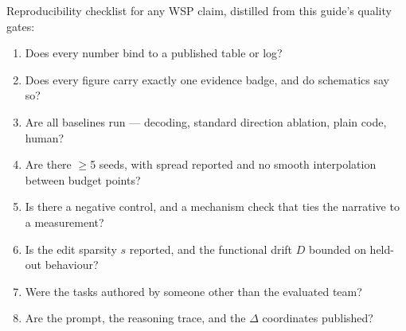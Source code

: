 \documentclass[11pt,a4paper]{article}
\begin{document}
Reproducibility checklist for any WSP claim, distilled from this guide's quality gates: \begin{enumerate}[leftmargin=1.6em, itemsep=1pt]
\item Does every number bind to a published table or log?
\item Does every figure carry exactly one evidence badge, and do schematics say so?
\item Are all baselines run --- decoding, standard direction ablation, plain code, human?
\item Are there $\geq$5 seeds, with spread reported and no smooth interpolation between budget points?
\item Is there a negative control, and a mechanism check that ties the narrative to a measurement?
\item Is the edit sparsity $s$ reported, and the functional drift $D$ bounded on held-out behaviour?
\item Were the tasks authored by someone other than the evaluated team?
\item Are the prompt, the reasoning trace, and the $\Delta$ coordinates published?
\end{enumerate}


\end{document}
